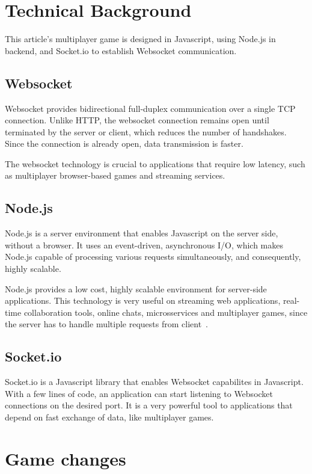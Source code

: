 \documentclass[english]{sbrt}
\begin{document}
\section{\textbf{Technical Background}}

This article's multiplayer game is designed in Javascript, using Node.js in backend, and Socket.io to establish Websocket communication.

\subsection{\textbf{Websocket}}
Websocket provides bidirectional full-duplex communication over a single TCP connection. Unlike HTTP, the websocket connection remains open until terminated by the server or client, which reduces the number of handshakes. Since the connection is already open, data transmission is faster.

The websocket technology is crucial to applications that require low latency, such as multiplayer browser-based games and streaming services.

\subsection{\textbf{Node.js}}
Node.js is a server environment that enables Javascript on the server side, without a browser. It uses an event-driven, asynchronous I/O, which makes Node.js capable of processing various requests simultaneously, and consequently, highly scalable.

Node.js provides a low cost, highly scalable environment for server-side applications. This technology is very useful on streaming web applications, real-time collaboration tools, online chats, microsservices and multiplayer games, since the server has to handle multiple requests from client~\cite{node-async}.

\subsection{\textbf{Socket.io}}
Socket.io is a Javascript library that enables Websocket capabilites in Javascript. With a few lines of code, an application can start listening to Websocket connections on the desired port. It is a very powerful tool to applications that depend on fast exchange of data, like multiplayer games.

\section{\textbf{Game changes}}
\end{document}
